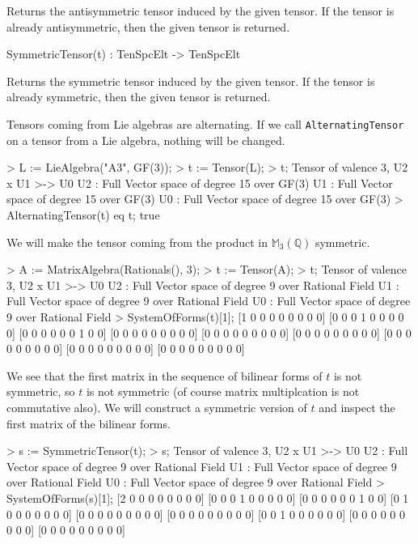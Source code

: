Returns the antisymmetric tensor induced by the given tensor. If 
the tensor is already antisymmetric, then the given tensor is returned.

\begin{intrinsics}
SymmetricTensor(t) : TenSpcElt -> TenSpcElt
\end{intrinsics}

Returns the symmetric tensor induced by the given tensor. If the tensor is 
already symmetric, then the given tensor is returned.

\begin{example}[AlternatingTensor]

Tensors coming from Lie algebras are alternating.
If we call \texttt{AlternatingTensor} on a tensor from a Lie algebra, nothing will be changed.
\begin{code}
> L := LieAlgebra("A3", GF(3));
> t := Tensor(L);
> t;
Tensor of valence 3, U2 x U1 >-> U0
U2 : Full Vector space of degree 15 over GF(3)
U1 : Full Vector space of degree 15 over GF(3)
U0 : Full Vector space of degree 15 over GF(3)
> AlternatingTensor(t) eq t;
true
\end{code}
\end{example}

\begin{example}[MakeSymmetric]

We will make the tensor coming from the product in $\mathbb{M}_3(\mathbb{Q})$ symmetric.
\begin{code}
> A := MatrixAlgebra(Rationals(), 3);
> t := Tensor(A);
> t;
Tensor of valence 3, U2 x U1 >-> U0
U2 : Full Vector space of degree 9 over Rational Field
U1 : Full Vector space of degree 9 over Rational Field
U0 : Full Vector space of degree 9 over Rational Field
> SystemOfForms(t)[1];
[1 0 0 0 0 0 0 0 0]
[0 0 0 1 0 0 0 0 0]
[0 0 0 0 0 0 1 0 0]
[0 0 0 0 0 0 0 0 0]
[0 0 0 0 0 0 0 0 0]
[0 0 0 0 0 0 0 0 0]
[0 0 0 0 0 0 0 0 0]
[0 0 0 0 0 0 0 0 0]
[0 0 0 0 0 0 0 0 0]
\end{code}

We see that the first matrix in the sequence of bilinear forms of $t$ is not symmetric, so $t$ is not symmetric (of course matrix multiplcation is not commutative also). 
We will construct a symmetric version of $t$ and inspect the first matrix of the bilinear forms.
\begin{code}
> s := SymmetricTensor(t);
> s;
Tensor of valence 3, U2 x U1 >-> U0
U2 : Full Vector space of degree 9 over Rational Field
U1 : Full Vector space of degree 9 over Rational Field
U0 : Full Vector space of degree 9 over Rational Field
> SystemOfForms(s)[1];
[2 0 0 0 0 0 0 0 0]
[0 0 0 1 0 0 0 0 0]
[0 0 0 0 0 0 1 0 0]
[0 1 0 0 0 0 0 0 0]
[0 0 0 0 0 0 0 0 0]
[0 0 0 0 0 0 0 0 0]
[0 0 1 0 0 0 0 0 0]
[0 0 0 0 0 0 0 0 0]
[0 0 0 0 0 0 0 0 0]
\end{code}
\end{example}


